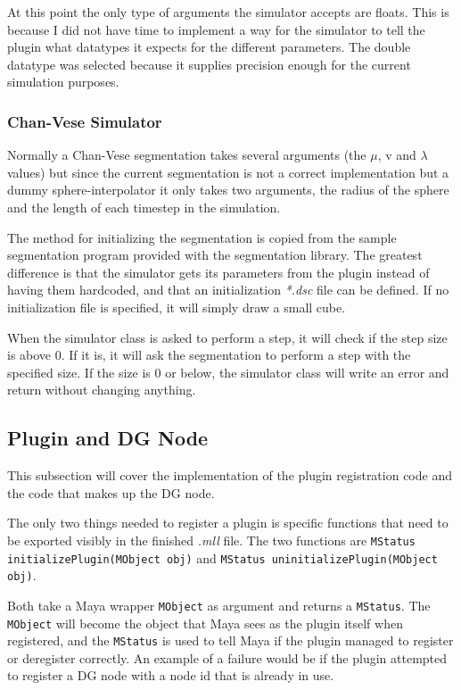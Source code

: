 At this point the only type of arguments the simulator accepts are floats. This
is because I did not have time to implement a way for the simulator to tell the
plugin what datatypes it expects for the different parameters. The double
datatype was selected because it supplies precision enough for the current
simulation purposes.


\subsubsection{Chan-Vese Simulator}

Normally a Chan-Vese segmentation takes several arguments (the $\mu$, v and
$\lambda$ values) but since the current segmentation is not a correct
implementation but a dummy sphere-interpolator it only takes two arguments, the
radius of the sphere and the length of each timestep in the simulation.

The method for initializing the segmentation is copied from the
sample segmentation program provided with the segmentation library. The greatest
difference is that the simulator gets its parameters from the plugin instead of
having them hardcoded, and that an initialization \textit{*.dsc} file can be defined.
If no initialization file is specified, it will simply draw a small cube.

When the simulator class is asked to perform a step, it will check if the step size is
above 0. If it is, it will ask the segmentation to perform a step with the
specified size. If the size is 0 or below, the simulator class will write an error and return
without changing anything.


\subsection{Plugin and DG Node}
\label{sec:plugnode}
This subsection will cover the implementation of the plugin registration code
and the code that makes up the DG node.

The only two things needed to register a plugin is specific functions that need
to be exported visibly in the finished \textit{.mll} file. The two functions are
\texttt{MStatus initializePlugin(MObject obj)} and \texttt{MStatus
  uninitializePlugin(MObject obj)}.

Both take a Maya wrapper \texttt{MObject} as argument and returns a
\texttt{MStatus}. The \texttt{MObject} will become the object that Maya sees as
the plugin itself when registered, and the \texttt{MStatus} is used to tell Maya
if the plugin managed to register or deregister correctly. An example of a
failure would be if the plugin attempted to register a DG node with a node id
that is already in use.

